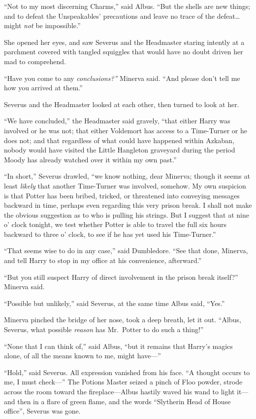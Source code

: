 ``Not to my most discerning Charms,'' said Albus. ``But the shells are
new things; and to defeat the Unspeakables' precautions and leave no
trace of the defeat\ldots{} might \emph{not} be impossible.''

She opened her eyes, and saw Severus and the Headmaster staring intently
at a parchment covered with tangled squiggles that would have no doubt
driven her mad to comprehend.

``Have you come to any \emph{conclusions?''} Minerva said. ``And please
don't tell me how you arrived at them.''

Severus and the Headmaster looked at each other, then turned to look at
her.

``We have concluded,'' the Headmaster said gravely, ``that either Harry
was involved or he was not; that either Voldemort has access to a
Time-Turner or he does not; and that regardless of what could have
happened within Azkaban, nobody would have visited the Little Hangleton
graveyard during the period Moody has already watched over it within my
own past.''

``In short,'' Severus drawled, ``we know nothing, dear Minerva; though
it seems at least \emph{likely} that another Time-Turner was involved,
somehow. My own suspicion is that Potter has been bribed, tricked, or
threatened into conveying messages backward in time, perhaps even
regarding this very prison break. I shall not make the obvious
suggestion as to who is pulling his strings. But I suggest that at nine
o' clock tonight, we test whether Potter is able to travel the full six
hours backward to three o' clock, to see if he has yet used his
Time-Turner.''

``That seems wise to do in any case,'' said Dumbledore. ``See that done,
Minerva, and tell Harry to stop in my office at his convenience,
afterward.''

``But you still suspect Harry of direct involvement in the prison break
itself?'' Minerva said.

``Possible but unlikely,'' said Severus, at the same time Albus said,
``Yes.''

Minerva pinched the bridge of her nose, took a deep breath, let it out.
``Albus, Severus, what possible \emph{reason} has Mr.~Potter to do such
a thing!''

``None that I can think of,'' said Albus, ``but it remains that Harry's
magics alone, of all the means known to me, might have---''

``Hold,'' said Severus. All expression vanished from his face. ``A
thought occurs to me, I must check---'' The Potions Master seized a
pinch of Floo powder, strode across the room toward the
fireplace---Albus hastily waved his wand to light it---and then in a
flare of green flame, and the words ``Slytherin Head of House office'',
Severus was gone.


